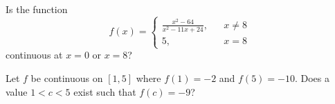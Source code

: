 \documentclass{ximera}
\begin{document}
\begin{exercise}



Is the function
\[
f(x)=\left\{\begin{array}{ccc} 
\frac{x^2-64}{x^2-11 x+24},		& & x\ne8\\
5, & & x=8
\end{array}\right.
\]
continuous at $x=0$ or $x=8$?

\begin{prompt}
\begin{multipleChoice}
\end{multipleChoice}
\end{prompt}

\end{exercise}

\begin{exercise}



Let $f$ be continuous on $\left[1,5\right]$ where $f(1)=-2$ and $f(5)=-10$. Does a value $1<c<5$ exist such that $f(c)=-9$?

\begin{multipleChoice}
\end{multipleChoice}

\end{exercise}
\end{document}
